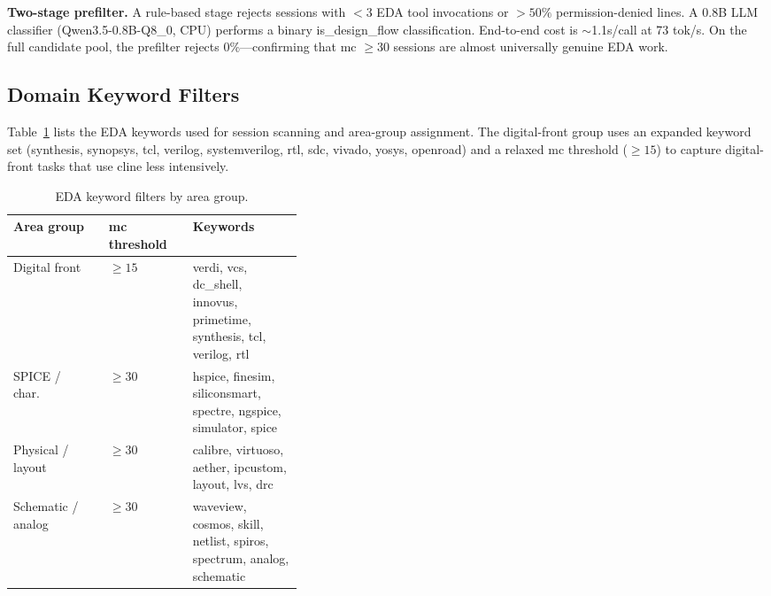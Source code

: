 \textbf{Two-stage prefilter.} A rule-based stage rejects sessions with $< 3$ EDA tool invocations or $> 50\%$ permission-denied lines. A 0.8B LLM classifier (Qwen3.5-0.8B-Q8\_0, CPU) performs a binary is\_design\_flow classification. End-to-end cost is $\sim$1.1s/call at 73 tok/s. On the full candidate pool, the prefilter rejects 0\%---confirming that mc $\geq 30$ sessions are almost universally genuine EDA work.

\subsection{Domain Keyword Filters}
\label{sec:keyword-filters}

Table~\ref{tab:keywords} lists the EDA keywords used for session scanning and area-group assignment. The digital-front group uses an expanded keyword set (synthesis, synopsys, tcl, verilog, systemverilog, rtl, sdc, vivado, yosys, openroad) and a relaxed mc threshold ($\geq 15$) to capture digital-front tasks that use cline less intensively.

\begin{table}[ht]
\centering
\small
\caption{EDA keyword filters by area group.}
\label{tab:keywords}
\begin{tabular}{@{}llp{0.38\linewidth}@{}}
\toprule
\textbf{Area group} & \textbf{mc threshold} & \textbf{Keywords} \\
\midrule
Digital front & $\geq 15$ & verdi, vcs, dc\_shell, innovus, primetime, synthesis, tcl, verilog, rtl \\
SPICE / char.\ & $\geq 30$ & hspice, finesim, siliconsmart, spectre, ngspice, simulator, spice \\
Physical / layout & $\geq 30$ & calibre, virtuoso, aether, ipcustom, layout, lvs, drc \\
Schematic / analog & $\geq 30$ & waveview, cosmos, skill, netlist, spiros, spectrum, analog, schematic \\
\bottomrule
\end{tabular}
\end{table}

